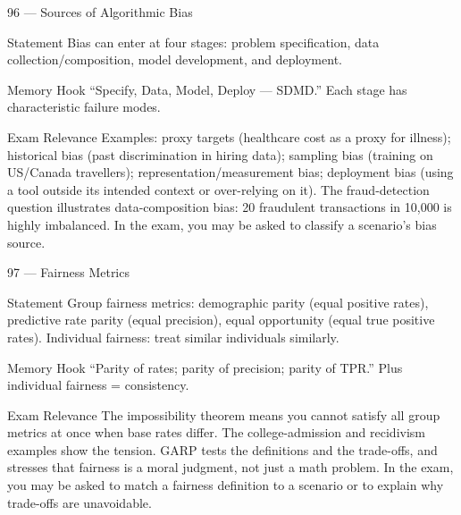 \documentclass[aspectratio=169,8pt]{beamer}
\begin{document}
	\begin{frame}{96 --- Sources of Algorithmic Bias}
		\begin{block}{Statement}
			Bias can enter at four stages: problem specification, data collection/composition, model development, and deployment.
		\end{block}
		\begin{block}{Memory Hook}
			``Specify, Data, Model, Deploy --- SDMD.'' Each stage has characteristic failure modes.
		\end{block}
		\begin{block}{Exam Relevance}
			Examples: proxy targets (healthcare cost as a proxy for illness); historical bias (past discrimination in hiring data); sampling bias (training on US/Canada travellers); representation/measurement bias; deployment bias (using a tool outside its intended context or over-relying on it). The fraud-detection question illustrates data-composition bias: 20 fraudulent transactions in 10,000 is highly imbalanced. In the exam, you may be asked to classify a scenario's bias source.
		\end{block}
	\end{frame}
	
	\begin{frame}{97 --- Fairness Metrics}
		\begin{block}{Statement}
			Group fairness metrics: demographic parity (equal positive rates), predictive rate parity (equal precision), equal opportunity (equal true positive rates). Individual fairness: treat similar individuals similarly.
		\end{block}
		\begin{block}{Memory Hook}
			``Parity of rates; parity of precision; parity of TPR.'' Plus individual fairness = consistency.
		\end{block}
		\begin{block}{Exam Relevance}
			The impossibility theorem means you cannot satisfy all group metrics at once when base rates differ. The college-admission and recidivism examples show the tension. GARP tests the definitions and the trade-offs, and stresses that fairness is a moral judgment, not just a math problem. In the exam, you may be asked to match a fairness definition to a scenario or to explain why trade-offs are unavoidable.
		\end{block}
	\end{frame}
	
\end{document}
